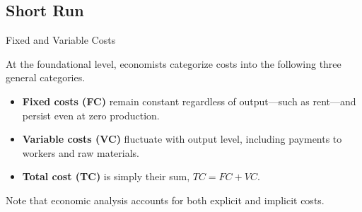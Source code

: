 \documentclass[10pt]{article}
\begin{document}
  \subsection{Short Run}

    \begin{core}{Fixed and Variable Costs}

      At the foundational level, economists categorize costs into the following three general categories.

      \begin{itemize}

        \item \textbf{Fixed costs (FC)} remain constant regardless of output---such as rent---and persist even at zero production.

        \item \textbf{Variable costs (VC)} fluctuate with output level, including payments to workers and raw materials.

        \item \textbf{Total cost (TC)} is simply their sum, $TC = FC + VC$.

      \end{itemize}

      Note that economic analysis accounts for both explicit and implicit costs.

    \end{core}
\end{document}
